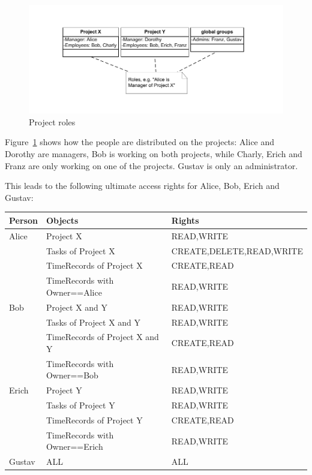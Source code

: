 \begin{figure}[ht]
	\begin{center}
		\includegraphics{images/Roles.pdf}
		\caption{Project roles}
		\label{project_roles}
	\end{center}
\end{figure}

Figure~\ref{project_roles} shows how the people are distributed on the projects:
Alice and Dorothy are managers, Bob is working on both projects, while Charly,
Erich and Franz are only working on one of the projects. Gustav is only an
administrator.

This leads to the following ultimate access rights for Alice, Bob, Erich and
Gustav:

\begin{tabular}{l|ll}
Person & Objects & Rights \\
\hline
Alice & Project X & READ,WRITE \\
	& Tasks of Project X & CREATE,DELETE,READ,WRITE \\
	& TimeRecords of Project X & CREATE,READ \\
	& TimeRecords with Owner==Alice & READ,WRITE \\
\hline
Bob & Project X and Y & READ,WRITE \\
	& Tasks of Project X and Y & READ,WRITE \\
	& TimeRecords of Project X and Y & CREATE,READ \\
	& TimeRecords with Owner==Bob & READ,WRITE \\
\hline
Erich & Project Y & READ,WRITE \\
	& Tasks of Project Y & READ,WRITE \\
	& TimeRecords of Project Y & CREATE,READ \\
	& TimeRecords with Owner==Erich & READ,WRITE \\
\hline
Gustav & ALL & ALL \\

\end{tabular}
